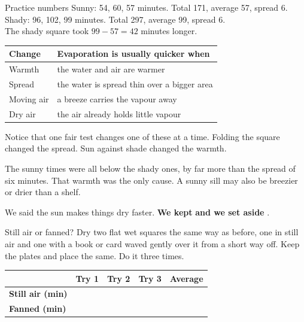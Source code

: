 \begin{worked}{Practice numbers}
Sunny: 54, 60, 57 minutes. Total 171, average 57, spread 6.\\
Shady: 96, 102, 99 minutes. Total 297, average 99, spread 6.\\
The shady square took $99-57=42$ minutes longer.
\end{worked}

\begin{center}
\sffamily\small\renewcommand{\arraystretch}{1.5}
\begin{tabular}{@{}p{3.4cm}p{6.6cm}@{}}
\toprule
\textbf{Change} & \textbf{Evaporation is usually quicker when}\\
\midrule
Warmth & the water and air are warmer\\
Spread & the water is spread thin over a bigger area\\
Moving air & a breeze carries the vapour away\\
Dry air & the air already holds little vapour\\
\bottomrule
\end{tabular}
\end{center}

Notice that one fair test changes one of these at a time. Folding the square changed the spread. Sun against shade changed the warmth.

{The sunny times were all below the shady ones, by far more than the spread of six minutes.}
{That warmth was the only cause. A sunny sill may also be breezier or drier than a shelf.}

\begin{keepbox}
We said the sun makes things dry faster. \textbf{We kept} \wline[3.4cm] \textbf{and we set aside} \wline[3.4cm].
\end{keepbox}

\begin{tryit}{Still air or fanned?}
Dry two flat wet squares the same way as before, one in still air and one with a book or card waved gently over it from a short way off. Keep the plates and place the same. Do it three times.\par\medskip
\renewcommand{\arraystretch}{1.6}
\begin{tabular}{|l|c|c|c|c|}
\hline
 & \textbf{Try 1} & \textbf{Try 2} & \textbf{Try 3} & \textbf{Average}\\ \hline
\textbf{Still air (min)} & & & & \\ \hline
\textbf{Fanned (min)} & & & & \\ \hline
\end{tabular}
\end{tryit}

